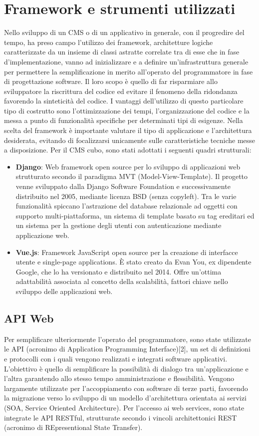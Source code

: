 \section{Framework e strumenti utilizzati}
Nello sviluppo di un CMS o di un applicativo in generale, con il progredire del tempo, ha preso campo l'utilizzo dei framework, architetture logiche caratterizzate da un insieme di classi astratte correlate tra di esse che in fase d'implementazione, vanno ad inizializzare e a definire un'infrastruttura generale per permettere la semplificazione in merito all'operato del programmatore in fase di progettazione software. Il loro scopo è quello di far risparmiare allo sviluppatore la riscrittura del codice ed evitare il fenomeno della ridondanza favorendo la sinteticità del codice. I vantaggi dell'utilizzo di questo particolare tipo di costrutto sono l'ottimizzazione dei tempi, l'organizzazione del codice e la messa a punto di funzionalità specifiche per determinati tipi di esigenze.
Nella scelta del framework è importante valutare il tipo di applicazione e l'architettura desiderata, evitando di focalizzarsi unicamente sulle caratteristiche tecniche messe a disposizione.\hfill \break
Per il CMS cubo, sono stati adottati i seguenti quadri strutturali:
\begin{itemize}
    \item \textbf{Django}: Web framework open source per lo sviluppo di applicazioni web strutturato secondo il paradigma MVT (Model-View-Template).
    Il progetto venne sviluppato dalla Django Software Foundation e successivamente distribuito nel 2005, mediante licenza BSD (senza copyleft). Tra le varie funzionalità spiccano l'astrazione del database relazionale ad oggetti con supporto multi-piattaforma, un sistema di template basato su tag ereditari ed un sistema per la gestione degli utenti con autenticazione mediante applicazione web.
    \item \textbf{Vue.js}: Framework JavaScript open source per la creazione di interfacce utente e single-page applications. È stato creato da Evan You, ex dipendente Google, che lo ha versionato e distribuito nel 2014. Offre un'ottima adattabilità associata al concetto della scalabilità, fattori chiave nello sviluppo delle applicazioni web.
\end{itemize}

\subsection{API Web}
Per semplificare ulteriormente l'operato del programmatore, sono state utilizzate le API (acronimo di Application Programming Interface)[2], un set di definizioni e protocolli con i quali vengono realizzati e integrati software applicativi. L'obiettivo è quello di semplificare la possibilità di dialogo tra un'applicazione e l'altra garantendo allo stesso tempo amministrazione e flessibilità.
Vengono largamente utilizzate per l'accoppiamento con software di terze parti, favorendo la migrazione verso lo sviluppo di un modello d'architettura orientata ai servizi (SOA, Service Oriented Architecture). \hfill \break
Per l'accesso ai web services, sono state integrate le API RESTful, strutturate secondo i vincoli architettonici REST (acronimo di REpresentional State Transfer).

